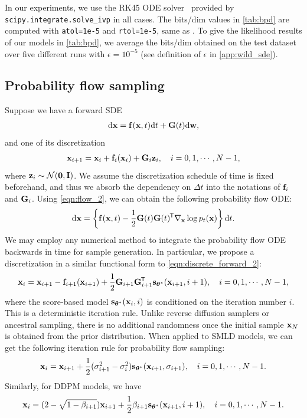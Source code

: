 In our experiments, we use the RK45 ODE solver~\citep{dormand1980family} provided by \verb|scipy.integrate.solve_ivp| in all cases. The bits/dim values in \cref{tab:bpd} are computed with \verb|atol=1e-5| and \verb|rtol=1e-5|, same as \citet{grathwohl2018ffjord}. To give the likelihood results of our models in \cref{tab:bpd}, we average the bits/dim obtained on the test dataset over five different runs with $\epsilon=10^{-5}$ (see definition of $\epsilon$ in \cref{app:wild_sde}).

\subsection{Probability flow sampling}\label{app:prob_flow_sampling}
Suppose we have a forward SDE
\begin{align*}
    \mathrm{d} \mathbf{x} = \mathbf{f}(\mathbf{x}, t) \mathrm{d} t + \mathbf{G}(t) \mathrm{d} \mathbf{w},
\end{align*}
and one of its discretization
\begin{align}
    \mathbf{x}_{i+1} = \mathbf{x}_i + \mathbf{f}_i(\mathbf{x}_i) + \mathbf{G}_i \mathbf{z}_i, \quad i = 0, 1, \cdots, N-1, \label{eqn:discrete_forward_2}
\end{align}
where $\mathbf{z}_i \sim \mathcal{N}(\mathbf{0}, \mathbf{I})$. We assume the discretization schedule of time is fixed beforehand, and thus we absorb the dependency on $\Delta t$ into the notations of $\mathbf{f}_i$ and $\mathbf{G}_i$. Using \cref{eqn:flow_2}, we can obtain the following probability flow ODE:
\begin{align}
    \mathrm{d} \mathbf{x} = \left\{ \mathbf{f}(\mathbf{x}, t) - \frac{1}{2}\mathbf{G}(t)\mathbf{G}(t)^{\mkern-1.5mu\mathsf{T}} \nabla_{\mathbf{x}} \log p_t(\mathbf{x}) \right\} \mathrm{d} t.
\end{align}
We may employ any numerical method to integrate the probability flow ODE backwards in time for sample generation. In particular, we propose a discretization in a similar functional form to \cref{eqn:discrete_forward_2}:
\begin{align*}
    \mathbf{x}_i = \mathbf{x}_{i+1} - \mathbf{f}_{i+1}(\mathbf{x}_{i+1}) + \frac{1}{2}\mathbf{G}_{i+1}\mathbf{G}_{i+1}^{\mkern-1.5mu\mathsf{T}} \mathbf{s}_{{\boldsymbol{\theta}}^*}(\mathbf{x}_{i+1}, i+1),\quad  i =0,1,\cdots, N-1,
\end{align*}
where the score-based model $\mathbf{s}_{{\boldsymbol{\theta}}^*}(\mathbf{x}_i, i)$ is conditioned on the iteration number $i$. This is a deterministic iteration rule. Unlike reverse diffusion samplers or ancestral sampling, there is no additional randomness once the initial sample $\mathbf{x}_N$ is obtained from the prior distribution. When applied to SMLD models, we can get the following iteration rule for probability flow sampling:
\begin{align}
    \mathbf{x}_i = \mathbf{x}_{i+1} + \frac{1}{2} (\sigma_{i+1}^2 - \sigma_i^2) \mathbf{s}_{{{\boldsymbol{\theta}}^*}}(\mathbf{x}_{i+1}, \sigma_{i+1}), \quad i=0,1,\cdots, N-1.
\end{align}
Similarly, for DDPM models, we have
\begin{align}
    \mathbf{x}_i = (2 - \sqrt{1 -\beta_{i+1}})\mathbf{x}_{i+1} + \frac{1}{2} \beta_{i+1} \mathbf{s}_{{\boldsymbol{\theta}}^*}(\mathbf{x}_{i+1}, i+1), \quad i=0,1,\cdots, N-1.
\end{align}

